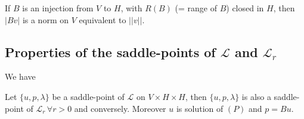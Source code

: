\begin{remark}\label{c5:rem2.1}%
If $B$ is an injection from $V$ to $H$, with $R(B)$ (= range of $B$) closed in $H$, then $|Bv|$ is a norm on $V$ equivalent  to $|| v ||$.
\end{remark}

\subsection{Properties of the saddle-points of $\mathscr{L}$ and 
$\mathscr{L}_r$}\label{c5:ss2.2}%

We have 

\begin{theorem}\label{c5:thm2.1}%
Let $\{u, p, \lambda \}$ be a saddle-point of $\mathscr{L}$ on $V
\times H \times H$, then $\{u, p, \lambda \}$ is also a saddle-point
of $\mathscr{L}_r\, \forall r > 0$ and conversely. Moreover $u$ is
solution of $(P)$ and $p= Bu$. 
\end{theorem}

